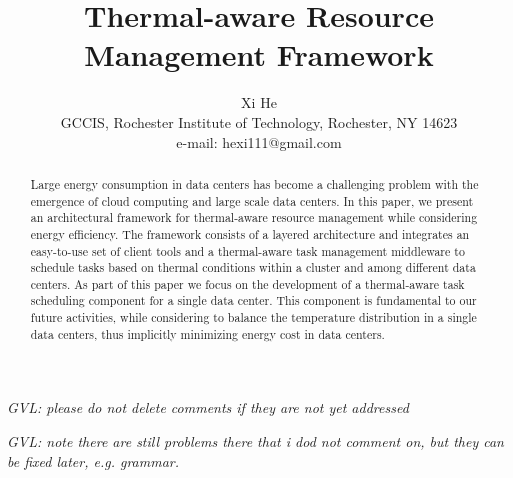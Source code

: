 \newcommand{\BH}{\mbox{~~~~}}
\newcommand{\SH}{\mbox{~~}}

\newcommand{\E}[1]{\footnote{{\color{red}\em  some error}}}
\newcommand{\GVL}[1]{{\color{red}\em  GVL: #1}~}
\newcommand{\WANG}[1]{{\color{blue}\em  WANG: #1}~}
\newcommand{\YOUNGE}[1]{{\color{blue}\em  YOUNGE: #1}~}

\newcommand{\AUTHOR}{Xi He\\
\small GCCIS, Rochester Institute of Technology, Rochester, NY 14623\\
\small e-mail: hexi111@gmail.com
\vspace{-1cm}%
}
\newcommand{\TITLE}{Thermal-aware Resource Management Framework}


\title{\TITLE}
\author{\AUTHOR}

\maketitle



\GVL{please do not delete comments if they are not yet addressed}

\GVL{note there are still problems there that i dod not comment on, but they can be fixed later, e.g. grammar.}

\begin{abstract}
Large energy consumption in data centers has become a challenging problem with the emergence of cloud computing and large scale data centers. In this paper, we present an architectural framework for thermal-aware resource management while considering energy efficiency. The framework consists of a layered architecture and integrates 
an easy-to-use set of client tools and a thermal-aware task management middleware to schedule tasks based on thermal conditions within a cluster and among different data centers. As part of this paper we focus on the development of a thermal-aware task scheduling component for a single data center. This component is fundamental to our future activities, while considering to balance the temperature distribution in a single data centers, thus implicitly minimizing energy cost in data centers. 
\end{abstract}

